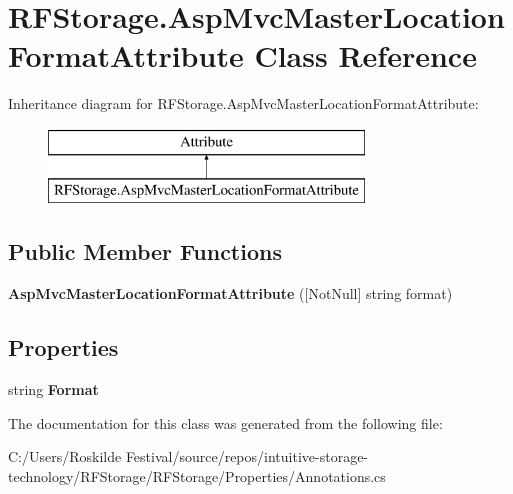 \hypertarget{class_r_f_storage_1_1_asp_mvc_master_location_format_attribute}{}\section{R\+F\+Storage.\+Asp\+Mvc\+Master\+Location\+Format\+Attribute Class Reference}
\label{class_r_f_storage_1_1_asp_mvc_master_location_format_attribute}
Inheritance diagram for R\+F\+Storage.\+Asp\+Mvc\+Master\+Location\+Format\+Attribute\+:\begin{figure}[H]
\begin{center}
\leavevmode
\includegraphics[height=2.000000cm]{class_r_f_storage_1_1_asp_mvc_master_location_format_attribute}
\end{center}
\end{figure}
\subsection*{Public Member Functions}
\begin{DoxyCompactItemize}
\item 
\mbox{\label{class_r_f_storage_1_1_asp_mvc_master_location_format_attribute_a9ab3ad5297e43aeb40795d6383ffced5}} 
{\bfseries Asp\+Mvc\+Master\+Location\+Format\+Attribute} (\mbox{[}Not\+Null\mbox{]} string format)
\end{DoxyCompactItemize}
\subsection*{Properties}
\begin{DoxyCompactItemize}
\item 
\mbox{\label{class_r_f_storage_1_1_asp_mvc_master_location_format_attribute_af929c2646587043830a67207cf5747a1}} 
string {\bfseries Format}
\end{DoxyCompactItemize}


The documentation for this class was generated from the following file\+:\begin{DoxyCompactItemize}
\item 
C\+:/\+Users/\+Roskilde Festival/source/repos/intuitive-\/storage-\/technology/\+R\+F\+Storage/\+R\+F\+Storage/\+Properties/Annotations.\+cs\end{DoxyCompactItemize}
